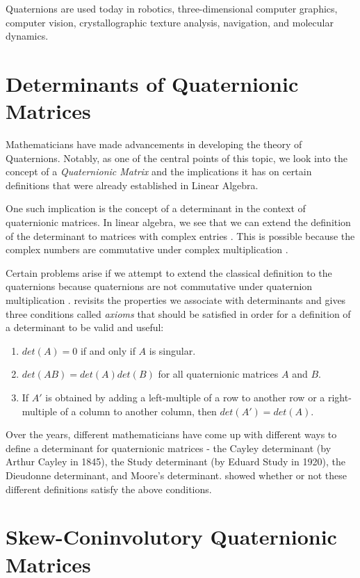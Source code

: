 Quaternions are used today in robotics, three-dimensional computer graphics, computer vision, crystallographic texture analysis, navigation, and molecular dynamics. 

\section{Determinants of Quaternionic Matrices}

Mathematicians have made advancements in developing the theory of Quaternions. Notably, as one of the central points of this topic, we look into the concept of a \emph{Quaternionic Matrix} and the implications it has on certain definitions that were already established in Linear Algebra. 

One such implication is the concept of a determinant in the context of quaternionic matrices. In linear algebra, we see that we can extend the definition of the determinant to matrices with complex entries \cite{stamaria}. This is possible because the complex numbers are commutative under complex multiplication \cite{aslaksen}. 

Certain problems arise if we attempt to extend the classical definition to the quaternions because quaternions are not commutative under quaternion multiplication \cite{aslaksen}. \cite{aslaksen} revisits the properties we associate with determinants and gives three conditions called \emph{axioms} that should be satisfied in order for a definition of a determinant to be valid and useful:
\begin{enumerate}
	\item $det(A) = 0$ if and only if $A$ is singular.
	\item $det(AB) = det(A)det(B)$ for all quaternionic matrices $A$ and $B$.
	\item If $A'$ is obtained by adding a left-multiple of a row to another row or a right-multiple of a column to another column, then $det(A')=det(A)$.
\end{enumerate}

Over the years, different mathematicians have come up with different ways to define a determinant for quaternionic matrices - the Cayley determinant (by Arthur Cayley in 1845), the Study determinant (by Eduard Study in 1920), the Dieudonne determinant, and Moore's determinant. \cite{aslaksen} showed whether or not these different definitions satisfy the above conditions.

\newpage

\section{Skew-Coninvolutory Quaternionic Matrices}

